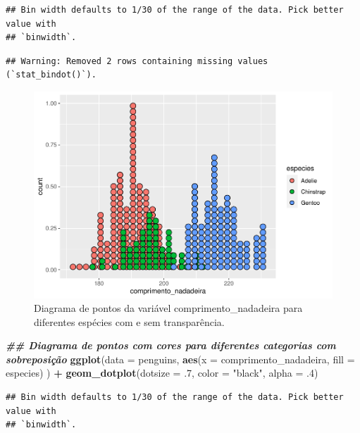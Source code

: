 \documentclass[
]{article}
\newenvironment{Shaded}{\begin{snugshade}}{\end{snugshade}}
\newcommand{\AttributeTok}[1]{\textcolor[rgb]{0.13,0.29,0.53}{#1}}
\newcommand{\DecValTok}[1]{\textcolor[rgb]{0.00,0.00,0.81}{#1}}
\newcommand{\DocumentationTok}[1]{\textcolor[rgb]{0.56,0.35,0.01}{\textbf{\textit{#1}}}}
\newcommand{\FunctionTok}[1]{\textcolor[rgb]{0.13,0.29,0.53}{\textbf{#1}}}
\newcommand{\NormalTok}[1]{#1}
\newcommand{\SpecialCharTok}[1]{\textcolor[rgb]{0.81,0.36,0.00}{\textbf{#1}}}
\newcommand{\StringTok}[1]{\textcolor[rgb]{0.31,0.60,0.02}{#1}}
\begin{document}
\begin{verbatim}
## Bin width defaults to 1/30 of the range of the data. Pick better value with
## `binwidth`.
\end{verbatim}

\begin{verbatim}
## Warning: Removed 2 rows containing missing values (`stat_bindot()`).
\end{verbatim}

\begin{figure}
\includegraphics[width=0.75\linewidth,height=0.75\textheight]{epr_files/figure-latex/fig-dot-flipper-cat-1} \caption{Diagrama de pontos da variável comprimento_nadadeira para diferentes espécies com e sem transparência.}\label{fig:fig-dot-flipper-cat-1}
\end{figure}

\begin{Shaded}
\begin{Highlighting}[]
\DocumentationTok{\#\# Diagrama de pontos com cores para diferentes categorias com sobreposição}
\FunctionTok{ggplot}\NormalTok{(}\AttributeTok{data =}\NormalTok{ penguins, }
       \FunctionTok{aes}\NormalTok{(}\AttributeTok{x =}\NormalTok{ comprimento\_nadadeira, }\AttributeTok{fill =}\NormalTok{ especies)}
\NormalTok{       ) }\SpecialCharTok{+}
    \FunctionTok{geom\_dotplot}\NormalTok{(}\AttributeTok{dotsize =}\NormalTok{ .}\DecValTok{7}\NormalTok{, }\AttributeTok{color =} \StringTok{"black"}\NormalTok{, }\AttributeTok{alpha =}\NormalTok{ .}\DecValTok{4}\NormalTok{)}
\end{Highlighting}
\end{Shaded}

\begin{verbatim}
## Bin width defaults to 1/30 of the range of the data. Pick better value with
## `binwidth`.
\end{verbatim}
\end{document}
